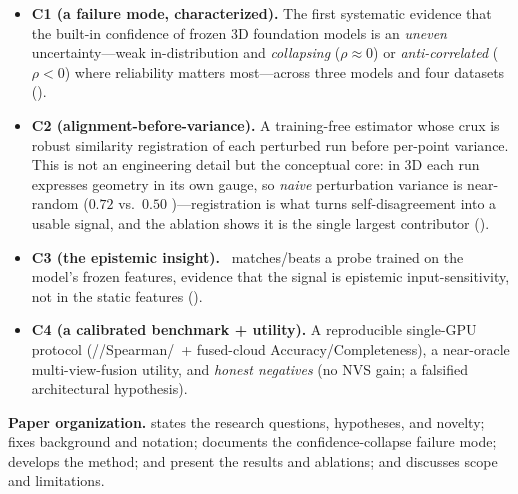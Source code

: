 \begin{itemize}[leftmargin=1.2em,itemsep=1pt,topsep=2pt]
\item \textbf{C1 (a failure mode, characterized).} The first systematic evidence that the built-in
confidence of frozen 3D foundation models is an \emph{uneven} uncertainty---weak in-distribution and
\emph{collapsing} ($\rho{\approx}0$) or \emph{anti-correlated} ($\rho<0$) where reliability matters
most---across three models and four datasets ().
\item \textbf{C2 (alignment-before-variance).} A training-free estimator whose crux is robust
similarity registration of each perturbed run before per-point variance. This is not an engineering
detail but the conceptual core: in 3D each run expresses geometry in its own gauge, so \emph{naive}
perturbation variance is near-random ($0.72$ vs.\ $0.50$ \ause)---registration is what turns
self-disagreement into a usable signal, and the ablation shows it is the single largest contributor
().
\item \textbf{C3 (the epistemic insight).} \trustr\ matches/beats a probe trained on the model's
frozen features, evidence that the signal is epistemic input-sensitivity, not in the static
features ().
\item \textbf{C4 (a calibrated benchmark + utility).} A reproducible single-GPU protocol
(\ause/\aurg/Spearman/\ece\ + fused-cloud Accuracy/Completeness), a near-oracle multi-view-fusion
utility, and \emph{honest negatives} (no NVS gain; a falsified architectural hypothesis).
\end{itemize}

\noindent\textbf{Paper organization.}  states the research questions, hypotheses,
and novelty;  fixes background and notation;  documents the
confidence-collapse failure mode;  develops the method;  and
 present the results and ablations; and  discusses scope and
limitations.
